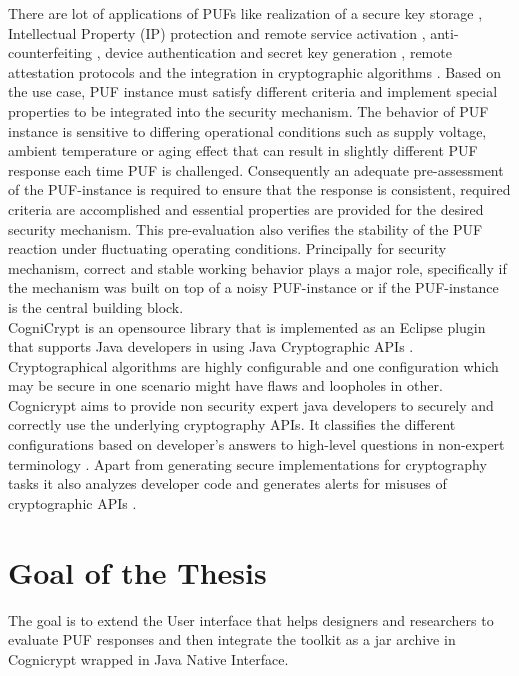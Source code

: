 There are lot of applications of PUFs like realization of a secure key storage \cite{2,3,4}, Intellectual Property (IP) protection and remote service activation \cite{5,11}, anti-counterfeiting \cite{6,7}, device authentication and secret key generation \cite{8,9,10}, remote attestation protocols \cite{12,13} and the integration in cryptographic algorithms \cite{14}. Based on the use case, PUF instance must satisfy different criteria and implement special properties to be integrated
into the security mechanism.
The behavior of PUF instance is sensitive to differing operational conditions such as supply voltage, ambient temperature or aging effect that can result in slightly different PUF response each time PUF is challenged. \pagebreak Consequently an adequate pre-assessment of the PUF-instance is required to ensure that the response is consistent, required criteria are accomplished and essential properties are provided for the desired security mechanism. This pre-evaluation also verifies the stability of
the PUF reaction under fluctuating operating conditions. Principally for security mechanism, correct and stable working behavior plays a major role, specifically if the mechanism was built on top of a noisy PUF-instance or if the PUF-instance is the central building block.\\

CogniCrypt is an opensource library that is implemented as an Eclipse plugin that supports Java developers in using Java Cryptographic APIs \cite{cogni}. Cryptographical algorithms are highly configurable and one configuration which may be secure in one scenario might have flaws and loopholes in other. Cognicrypt aims to provide non security expert java developers to securely and correctly use the underlying cryptography APIs. 
It classifies the different configurations based on developer's answers to high-level questions in non-expert terminology \cite{onward2015}. Apart from generating secure implementations for cryptography tasks it also analyzes developer code and generates alerts for misuses of cryptographic APIs \cite{cogni}. 


\section{Goal of the Thesis}
The goal is to extend the User interface that helps designers and researchers to evaluate PUF responses  and then integrate the toolkit as a jar archive in Cognicrypt wrapped in Java Native Interface.

